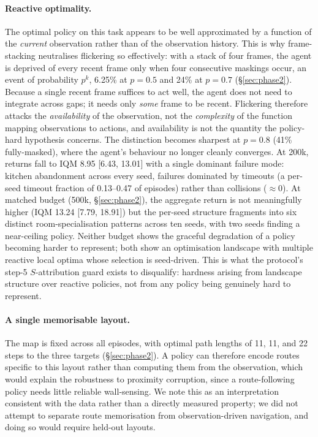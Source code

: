 \documentclass[10pt]{article}
\begin{document}
\paragraph{Reactive optimality.} The optimal policy on this task appears to be well
approximated by a function of the \emph{current} observation rather than of the observation
history. This is why frame-stacking neutralises flickering so effectively: with a stack of
four frames, the agent is deprived of every recent frame only when four consecutive maskings
occur, an event of probability $p^k$, 6.25\% at $p=0.5$ and 24\% at $p=0.7$
(\S\ref{sec:phase2}). Because a single recent frame suffices to act well, the agent does not
need to integrate across gaps; it needs only \emph{some} frame to be recent. Flickering
therefore attacks the \emph{availability} of the observation, not the \emph{complexity} of
the function mapping observations to actions, and availability is not the quantity the
policy-hard hypothesis concerns. The distinction becomes sharpest at $p=0.8$ (41\%
fully-masked), where the agent's behaviour no longer cleanly converges. At 200k, returns fall
to IQM 8.95 [6.43, 13.01] with a single dominant failure mode: kitchen abandonment across
every seed, failures dominated by timeouts (a per-seed timeout fraction of 0.13--0.47 of
episodes) rather than collisions (${\approx}0$). At matched budget (500k,
\S\ref{sec:phase2}), the aggregate return is not meaningfully higher (IQM 13.24 [7.79,
18.91]) but the per-seed structure fragments into six distinct room-specialisation patterns
across ten seeds, with two seeds finding a near-ceiling policy. Neither budget shows the
graceful degradation of a policy becoming harder to represent; both show an optimisation
landscape with multiple reactive local optima whose selection is seed-driven. This is what
the protocol's step-5 $S$-attribution guard exists to disqualify: hardness arising from
landscape structure over reactive policies, not from any policy being genuinely hard to
represent.

\paragraph{A single memorisable layout.} The map is fixed across all episodes, with optimal
path lengths of 11, 11, and 22 steps to the three targets (\S\ref{sec:phase2}). A policy can
therefore encode routes specific to this layout rather than computing them from the
observation, which would explain the robustness to proximity corruption, since a
route-following policy needs little reliable wall-sensing. We note this as an interpretation
consistent with the data rather than a directly measured property; we did not attempt to
separate route memorisation from observation-driven navigation, and doing so would require
held-out layouts.
\end{document}
